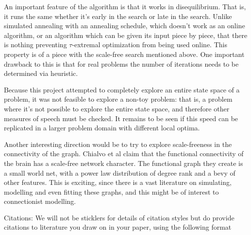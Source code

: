 \documentclass[12pt]{article}
\begin{document}
An important feature of the algorithm is that it works in disequilibrium. That is, it runs the same whether it's early in the search or late in the search. Unlike simulated annealing with an annealing schedule, which doesn't work as an online algorithm, or an algorithm which can be given its input piece by piece, that there is nothing preventing $\tau$-extremal optimization from being used online. This property is of a piece with the scale-free search mentioned above. One important drawback to this is that for real problems the number of iterations needs to be determined via heuristic.

Because this project attempted to completely explore an entire state space of a problem, it was not feasible to explore a non-toy problem: that is, a problem where it's not possible to explore the entire state space, and therefore other measures of speech must be checked. It remains to be seen if this speed can be replicated in a larger problem domain with different local optima.

Another interesting direction would be to try to explore scale-freeness in the connectivity of the graph. Chialvo et al claim that the functional connectivity of the brain has a scale-free network character. The functional graph they create is a small world net, with a power law distribution of degree rank and a bevy of other features. This is exciting, since there is a vast literature on simulating, modelling and even fitting these graphs, and this might be of interest to connectionist modelling.

\begin{thebibliography}[99]

    Citations:   We will not be sticklers for details of citation styles but do provide citations to literature you draw on in your paper, using the following format
\end{thebibliography}
\end{document}
